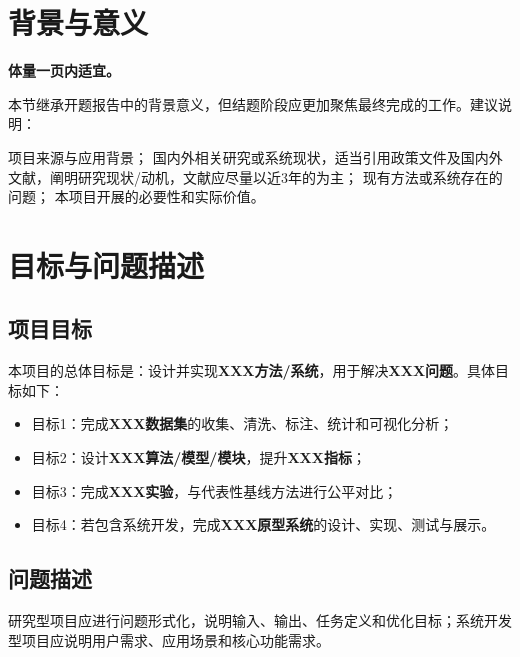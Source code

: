 \documentclass{style/course-report}
\begin{document}
\makecover


\section{背景与意义}

\textbf{体量一页内适宜。}

本节继承开题报告中的背景意义，但结题阶段应更加聚焦最终完成的工作。建议说明：

项目来源与应用背景；
国内外相关研究或系统现状，适当引用政策文件\cite{YunNan}及国内外文献\cite{Chen2025IoVCrowdsensing,JTBH202106001}，阐明研究现状/动机，文献应尽量以近3年的为主；
现有方法或系统存在的问题；
本项目开展的必要性和实际价值。

\section{目标与问题描述}

\subsection{项目目标}

本项目的总体目标是：设计并实现\textbf{XXX方法/系统}，用于解决\textbf{XXX问题}。具体目标如下：
\begin{itemize}
    \item 目标1：完成\textbf{XXX数据集}的收集、清洗、标注、统计和可视化分析；
    \item 目标2：设计\textbf{XXX算法/模型/模块}，提升\textbf{XXX指标}；
    \item 目标3：完成\textbf{XXX实验}，与代表性基线方法进行公平对比；
    \item 目标4：若包含系统开发，完成\textbf{XXX原型系统}的设计、实现、测试与展示。
\end{itemize}

\subsection{问题描述}

研究型项目应进行问题形式化，说明输入、输出、任务定义和优化目标；系统开发型项目应说明用户需求、应用场景和核心功能需求。
\end{document}
